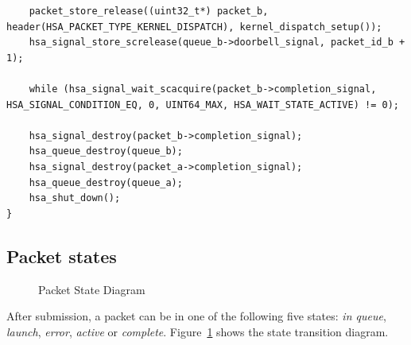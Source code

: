 \documentclass[final,oneside]{book}
\begin{document}
\begin{lstlisting}
    packet_store_release((uint32_t*) packet_b, header(HSA_PACKET_TYPE_KERNEL_DISPATCH), kernel_dispatch_setup());
    hsa_signal_store_screlease(queue_b->doorbell_signal, packet_id_b + 1);

    while (hsa_signal_wait_scacquire(packet_b->completion_signal, HSA_SIGNAL_CONDITION_EQ, 0, UINT64_MAX, HSA_WAIT_STATE_ACTIVE) != 0);

    hsa_signal_destroy(packet_b->completion_signal);
    hsa_queue_destroy(queue_b);
    hsa_signal_destroy(packet_a->completion_signal);
    hsa_queue_destroy(queue_a);
    hsa_shut_down();
}
\end{lstlisting}

\subsection{Packet states}\label{packet-states}

\begin{figure}[b]
  \centering
  \scriptsize
{}
  \centering
  \caption{Packet State Diagram}
  \label{fig:packetstate}
\end{figure}

After submission, a packet can be in one of the following five states:
\emph{in queue}, \emph{launch}, \emph{error}, \emph{active} or
\emph{complete}. Figure~\ref{fig:packetstate} shows the state transition
diagram.
\end{document}
